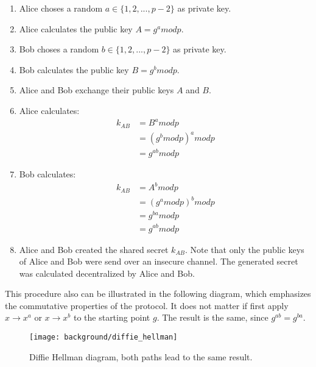 \begin{enumerate}
\item Alice choses a random $a \in \{1, 2, ... , p-2\}$ as private key. 
\item Alice calculates the public key $A = g^a mod p$.
\item Bob choses a random $b \in \{1, 2, ... , p-2\}$ as private key. 
\item Bob calculates the public key $B = g^b mod p$.
\item Alice and Bob exchange their public keys $A$ and $B$.
\item Alice calculates: 
\begin{equation}
\begin{split}
k_{AB} & = B^a mod p \\
 & = (g^b mod p)^a mod p \\
 & = g^{a b} mod p
\end{split}
\end{equation}
\item Bob calculates: 
\begin{equation}
\begin{split}
k_{AB} & = A^b mod p \\
 & = (g^a mod p)^b mod p \\
 & = g^{b a} mod p \\
 & = g^{a b} mod p
\end{split}
\end{equation}
\item Alice and Bob created the shared secret $k_{AB}$. Note that only the public keys of Alice and Bob were send over an insecure channel. The generated secret was calculated decentralized by Alice and Bob.
\end{enumerate}
This procedure also can be illustrated in the following diagram, which emphasizes the commutative properties of the protocol. It does not matter if first apply $x \to x^a$ or $x \to x^b$ to the starting point $g$. The result is the same, since $g^{ab} = g^{ba}$.

\begin{figure}[htpb]
  \centering
  \texttt{[image: background/diffie\_hellman]}
  \caption[Diffie Hellman diagram]{Diffie Hellman diagram, both paths lead to the same result.}
  \label{fig:diffie_hellman}
\end{figure}

